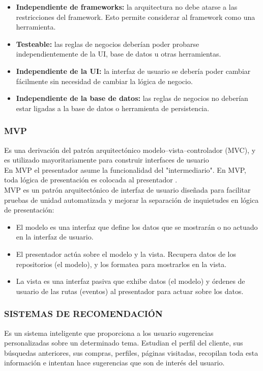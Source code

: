 \begin{itemize}
\item \textbf{Independiente de frameworks:} la arquitectura no debe atarse a las restricciones del framework. Esto permite considerar al framework como una herramienta.
\item \textbf{Testeable:} las reglas de negocios deberían poder probarse independientemente de la UI, base de datos u otras herramientas.
\item \textbf{Independiente de la UI:} la interfaz de usuario se debería poder cambiar fácilmente sin necesidad de cambiar la lógica de negocio.
\item \textbf{Independiente de la base de datos:} las reglas de negocios no deberían estar ligadas a la base de datos o herramienta de persistencia.
\end{itemize}

\subsubsection{\textbf{MVP}}
Es una derivación del patrón arquitectónico modelo–vista–controlador (MVC), y es utilizado mayoritariamente para construir interfaces de usuario\\
En MVP el presentador asume la funcionalidad del "intermediario". En MVP, toda lógica de presentación es colocada al presentador .\\
MVP es un patrón arquitectónico de interfaz de usuario diseñada para facilitar pruebas de unidad automatizada y mejorar la separación de inquietudes en lógica de presentación:
\begin{itemize}
\item El modelo es una interfaz que define los datos que se mostrarán o no actuado en la interfaz de usuario.
\item El presentador actúa sobre el modelo y la vista. Recupera datos de los repositorios (el modelo), y los formatea para mostrarlos en la vista.
\item La vista es una interfaz pasiva que exhibe datos (el modelo) y órdenes de usuario de las rutas (eventos) al presentador para actuar sobre los datos.
\end{itemize}

\subsubsection{\textbf{SISTEMAS DE RECOMENDACIÓN}}
Es un sistema inteligente que proporciona a los usuario sugerencias personalizadas sobre un determinado tema. Estudian el perfil del cliente, sus búsquedas anteriores, sus compras, perfiles, páginas visitadas, recopilan toda esta información e intentan hace sugerencias que son de interés del usuario.\\

